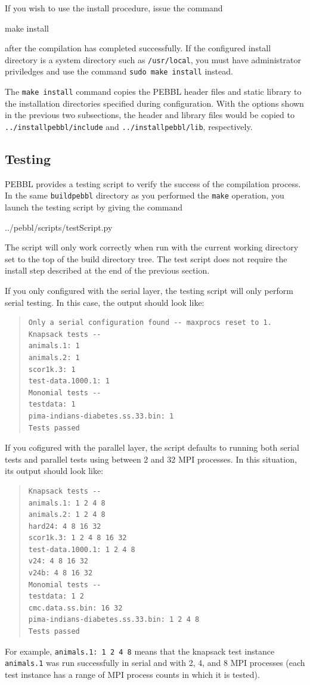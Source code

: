 If you wish to use the install procedure, issue the command 
\begin{codeblock}
make install
\end{codeblock}
after the compilation has completed successfully.  If the configured install
directory is a system directory such as \texttt{/usr/local}, you must have
administrator priviledges and use the command \texttt{sudo make install}
instead.

The \texttt{make install} command copies the PEBBL header files and static 
library to the installation directories specified during configuration.  With
the options shown in the previous two subsections, the header and library
files would be copied to \texttt{../installpebbl/include} and
\texttt{../installpebbl/lib}, respectively.

\subsection{Testing}
\label{sec:test}
PEBBL provides a testing script to verify the success of the compilation
process.  In the same \texttt{buildpebbl} directory as you performed the
\texttt{make} operation, you launch the testing script by giving the command
\begin{codeblock}
../pebbl/scripts/testScript.py
\end{codeblock}
The script will only work correctly when run with the current working
directory set to the top of the build directory tree.  The test script does
not require the install step described at the end of the previous section.

If you only configured with the serial layer, the testing script will only
perform serial testing.  In this case, the output should look like:
\begin{quote}
\begin{verbatim}
Only a serial configuration found -- maxprocs reset to 1.
Knapsack tests --
animals.1: 1
animals.2: 1
scor1k.3: 1
test-data.1000.1: 1
Monomial tests --
testdata: 1
pima-indians-diabetes.ss.33.bin: 1
Tests passed
\end{verbatim}
\end{quote}
If you cofigured with the parallel layer, the script defaults to running both
serial tests and parallel tests using between 2 and 32 MPI processes.  In this
situation, its output should look like:
\begin{quote}
\begin{verbatim}
Knapsack tests --
animals.1: 1 2 4 8
animals.2: 1 2 4 8
hard24: 4 8 16 32
scor1k.3: 1 2 4 8 16 32
test-data.1000.1: 1 2 4 8
v24: 4 8 16 32
v24b: 4 8 16 32
Monomial tests --
testdata: 1 2
cmc.data.ss.bin: 16 32
pima-indians-diabetes.ss.33.bin: 1 2 4 8
Tests passed
\end{verbatim}
\end{quote}
For example, \texttt{animals.1:~1 2 4 8} means that the knapsack test instance
\texttt{animals.1} was run successfully in serial and with 2, 4, and 8 MPI
processes (each test instance has a range of MPI process counts in which it
is tested).

